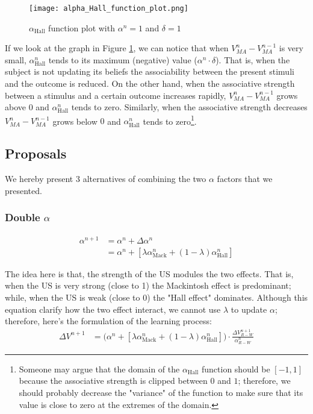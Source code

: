 \documentclass[11pt,a4paper]{article}
\newcommand{\alphamack}{\alpha _{\text{Mack}}}
\newcommand{\alphahall}{\alpha _{\text{Hall}}}
\begin{document}
\begin{figure}[h!]
    \centering
    \texttt{[image: alpha\_Hall\_function\_plot.png]}
    \caption{$\alphahall$ function plot with $\alpha^n = 1$ and $\delta = 1$}
    \label{fig:alpha_hall_plot}
\end{figure}

If we look at the graph in Figure \ref{fig:alpha_hall_plot}, we can notice that when $V^n_{MA}-V^{n-1}_{MA}$ is very small, $\alphahall^n$ tends to its maximum (negative) value ($\alpha^n \cdot \delta$). That is, when the subject is not updating its beliefs the associability between the present stimuli and the outcome is reduced. On the other hand, when the associative strength between a stimulus and a certain outcome increases rapidly, $V^n_{MA}-V^{n-1}_{MA}$ grows above $0$ and $\alphahall^n$ tends to zero. Similarly, when the associative strength decreases $V^n_{MA}-V^{n-1}_{MA}$ grows below $0$ and $\alphahall^n$ tends to zero\footnote{Someone may argue that the domain of the $\alphahall$ function should be $[-1,1]$ because the associative strength is clipped between $0$ and $1$; therefore, we should probably decrease the "variance" of the function to make sure that its value is close to zero at the extremes of the domain.}.

\subsection{Proposals}

We hereby present 3 alternatives of combining the two $\alpha$ factors that we presented.

\subsubsection{Double $\alpha$}
\begin{equation}
	\begin{aligned}
		\alpha ^{n + 1}
			&= \alpha ^n + \Delta \alpha ^n \\
			&= \alpha ^n + \left[ \lambda \alphamack ^n + (1 - \lambda) \alphahall ^n \right] 
	\end{aligned}
\end{equation}

The idea here is that, the strength of the US modules the two effects. That is, when the US is very strong (close to 1) the Mackintosh effect is predominant; while, when the US is weak (close to 0) the "Hall effect" dominates. Although this equation clarify how the two effect interact, we cannot use $\lambda$ to update $\alpha$; therefore, here's the formulation of the learning process:
\begin{equation}
    \begin{aligned}
    \Delta V^{n+1} &= \big( \alpha ^n + \left[ \lambda \alphamack ^n + (1 - \lambda) \alphahall ^n \right] \big) \cdot \frac{\Delta V^{n+1}_{R-W}}{\alpha^n_{R-W}}
    \end{aligned}
\end{equation}
\end{document}
